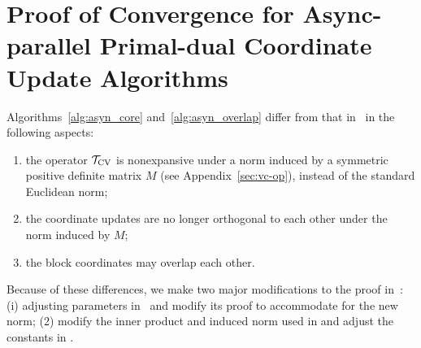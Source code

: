 \section{Proof of Convergence for Async-parallel Primal-dual Coordinate Update Algorithms}\label{pf:pdasync}
Algorithms~\ref{alg:asyn_core} and~\ref{alg:asyn_overlap} differ from that in~\cite{Peng_2015_AROCK} in the following aspects:
\begin{enumerate}
\item the operator ${{\mathcal{T}}_{\textnormal{CV}}}$ is nonexpansive under a norm induced by a symmetric positive definite matrix $M$ (see Appendix~\ref{sec:vc-op}), instead of the standard Euclidean norm;
\item the coordinate updates are no longer orthogonal to each other under the norm induced by $M$;
\item the block coordinates may overlap each other.
\end{enumerate}
Because of these differences, we make two major modifications to the proof in~\cite[Section 3]{Peng_2015_AROCK}: (i) adjusting parameters in~\cite[Lemma 2]{Peng_2015_AROCK} and modify its proof to accommodate for the new norm; (2) modify the inner product and induced norm used in \cite[Theorem 2]{Peng_2015_AROCK} and adjust the constants in \cite[Theorems 2 and 3]{Peng_2015_AROCK}.

